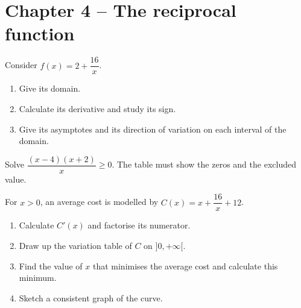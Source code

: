 \section*{Chapter 4 -- The reciprocal function}
\begin{exercice}
Consider $f(x)=2+\dfrac{16}x$.
\begin{enumerate}
\item Give its domain.
\item Calculate its derivative and study its sign.
\item Give its asymptotes and its direction of variation on each interval of the domain.
\end{enumerate}
\end{exercice}
\begin{exercice}
Solve $\dfrac{(x-4)(x+2)}x\geq0$. The table must show the zeros and the excluded value.
\end{exercice}
\begin{exercice}
For $x>0$, an average cost is modelled by $C(x)=x+\dfrac{16}x+12$.
\begin{enumerate}
\item Calculate $C'(x)$ and factorise its numerator.
\item Draw up the variation table of $C$ on $]0,+\infty[$.
\item Find the value of $x$ that minimises the average cost and calculate this minimum.
\item Sketch a consistent graph of the curve.
\end{enumerate}
\end{exercice}

